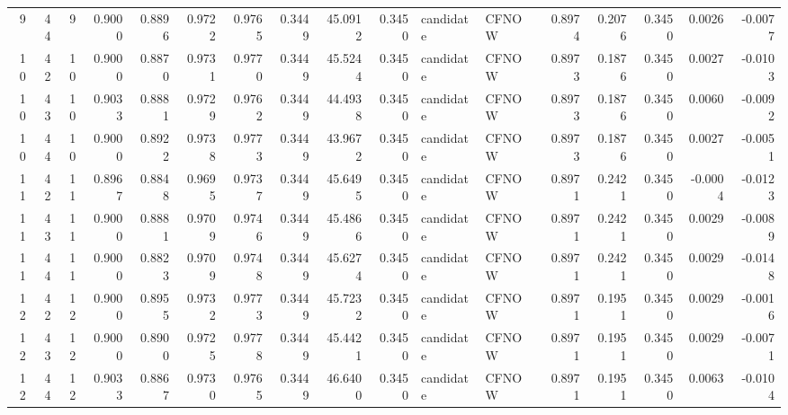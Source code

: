\begin{tabular}{rrrrrrrrrrllrrrrr}
  9 &    44 &            9 &  0.9000 &   0.8896 &     0.9722 &      0.9765 &           0.3449 &      45.0912 &  0.3450 & candidate &  CFNOW &          0.8974 &               0.2076 &                     0.3450 &   0.0026 &   -0.0077 \\
 10 &    42 &           10 &  0.9000 &   0.8870 &     0.9731 &      0.9770 &           0.3449 &      45.5244 &  0.3450 & candidate &  CFNOW &          0.8973 &               0.1876 &                     0.3450 &   0.0027 &   -0.0103 \\
 10 &    43 &           10 &  0.9033 &   0.8881 &     0.9729 &      0.9762 &           0.3449 &      44.4938 &  0.3450 & candidate &  CFNOW &          0.8973 &               0.1876 &                     0.3450 &   0.0060 &   -0.0092 \\
 10 &    44 &           10 &  0.9000 &   0.8922 &     0.9738 &      0.9773 &           0.3449 &      43.9672 &  0.3450 & candidate &  CFNOW &          0.8973 &               0.1876 &                     0.3450 &   0.0027 &   -0.0051 \\
 11 &    42 &           11 &  0.8967 &   0.8848 &     0.9695 &      0.9737 &           0.3449 &      45.6495 &  0.3450 & candidate &  CFNOW &          0.8971 &               0.2421 &                     0.3450 &  -0.0004 &   -0.0123 \\
 11 &    43 &           11 &  0.9000 &   0.8881 &     0.9709 &      0.9746 &           0.3449 &      45.4866 &  0.3450 & candidate &  CFNOW &          0.8971 &               0.2421 &                     0.3450 &   0.0029 &   -0.0089 \\
 11 &    44 &           11 &  0.9000 &   0.8823 &     0.9709 &      0.9748 &           0.3449 &      45.6274 &  0.3450 & candidate &  CFNOW &          0.8971 &               0.2421 &                     0.3450 &   0.0029 &   -0.0148 \\
 12 &    42 &           12 &  0.9000 &   0.8955 &     0.9732 &      0.9773 &           0.3449 &      45.7232 &  0.3450 & candidate &  CFNOW &          0.8971 &               0.1951 &                     0.3450 &   0.0029 &   -0.0016 \\
 12 &    43 &           12 &  0.9000 &   0.8900 &     0.9725 &      0.9778 &           0.3449 &      45.4421 &  0.3450 & candidate &  CFNOW &          0.8971 &               0.1951 &                     0.3450 &   0.0029 &   -0.0071 \\
 12 &    44 &           12 &  0.9033 &   0.8867 &     0.9730 &      0.9765 &           0.3449 &      46.6400 &  0.3450 & candidate &  CFNOW &          0.8971 &               0.1951 &                     0.3450 &   0.0063 &   -0.0104 \\

\end{tabular}
